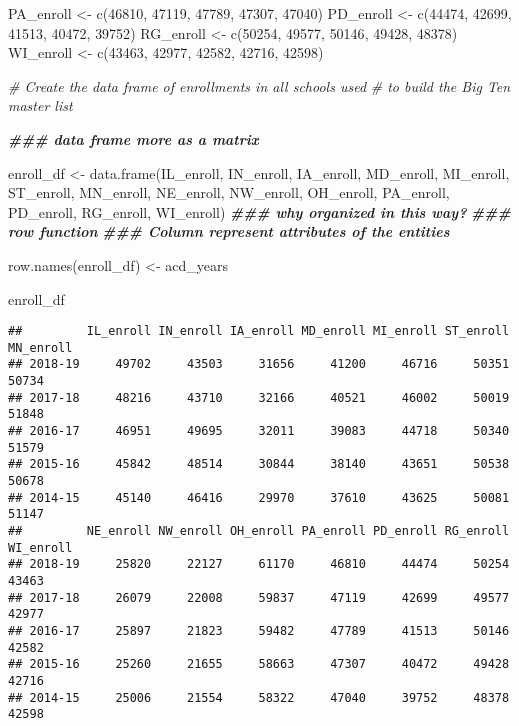 \documentclass[
]{article}
\newenvironment{Shaded}{\begin{snugshade}}{\end{snugshade}}
\newcommand{\CommentTok}[1]{\textcolor[rgb]{0.56,0.35,0.01}{\textit{#1}}}
\newcommand{\DecValTok}[1]{\textcolor[rgb]{0.00,0.00,0.81}{#1}}
\newcommand{\DocumentationTok}[1]{\textcolor[rgb]{0.56,0.35,0.01}{\textbf{\textit{#1}}}}
\newcommand{\FunctionTok}[1]{\textcolor[rgb]{0.00,0.00,0.00}{#1}}
\newcommand{\NormalTok}[1]{#1}
\newcommand{\OtherTok}[1]{\textcolor[rgb]{0.56,0.35,0.01}{#1}}
\begin{document}
\begin{Shaded}
\begin{Highlighting}[]
\NormalTok{PA\_enroll }\OtherTok{\textless{}{-}} \FunctionTok{c}\NormalTok{(}\DecValTok{46810}\NormalTok{, }\DecValTok{47119}\NormalTok{, }\DecValTok{47789}\NormalTok{, }\DecValTok{47307}\NormalTok{, }\DecValTok{47040}\NormalTok{)}
\NormalTok{PD\_enroll }\OtherTok{\textless{}{-}} \FunctionTok{c}\NormalTok{(}\DecValTok{44474}\NormalTok{, }\DecValTok{42699}\NormalTok{, }\DecValTok{41513}\NormalTok{, }\DecValTok{40472}\NormalTok{, }\DecValTok{39752}\NormalTok{)}
\NormalTok{RG\_enroll }\OtherTok{\textless{}{-}} \FunctionTok{c}\NormalTok{(}\DecValTok{50254}\NormalTok{, }\DecValTok{49577}\NormalTok{, }\DecValTok{50146}\NormalTok{, }\DecValTok{49428}\NormalTok{, }\DecValTok{48378}\NormalTok{)}
\NormalTok{WI\_enroll }\OtherTok{\textless{}{-}} \FunctionTok{c}\NormalTok{(}\DecValTok{43463}\NormalTok{, }\DecValTok{42977}\NormalTok{, }\DecValTok{42582}\NormalTok{, }\DecValTok{42716}\NormalTok{, }\DecValTok{42598}\NormalTok{)}

\CommentTok{\# Create the data frame of enrollments in all schools used }
\CommentTok{\# to build the Big Ten master list}

\DocumentationTok{\#\#\# data frame more as a matrix }

\NormalTok{enroll\_df }\OtherTok{\textless{}{-}} \FunctionTok{data.frame}\NormalTok{(IL\_enroll, IN\_enroll, IA\_enroll, MD\_enroll, MI\_enroll, }
\NormalTok{                    ST\_enroll, MN\_enroll, NE\_enroll, NW\_enroll, OH\_enroll, }
\NormalTok{                    PA\_enroll, PD\_enroll, RG\_enroll, WI\_enroll)}
\DocumentationTok{\#\#\# why organized in this way? }
\DocumentationTok{\#\#\# row function}
\DocumentationTok{\#\#\# Column represent attributes of the entities }


\FunctionTok{row.names}\NormalTok{(enroll\_df) }\OtherTok{\textless{}{-}}\NormalTok{ acd\_years}

\NormalTok{enroll\_df}
\end{Highlighting}
\end{Shaded}

\begin{verbatim}
##         IL_enroll IN_enroll IA_enroll MD_enroll MI_enroll ST_enroll MN_enroll
## 2018-19     49702     43503     31656     41200     46716     50351     50734
## 2017-18     48216     43710     32166     40521     46002     50019     51848
## 2016-17     46951     49695     32011     39083     44718     50340     51579
## 2015-16     45842     48514     30844     38140     43651     50538     50678
## 2014-15     45140     46416     29970     37610     43625     50081     51147
##         NE_enroll NW_enroll OH_enroll PA_enroll PD_enroll RG_enroll WI_enroll
## 2018-19     25820     22127     61170     46810     44474     50254     43463
## 2017-18     26079     22008     59837     47119     42699     49577     42977
## 2016-17     25897     21823     59482     47789     41513     50146     42582
## 2015-16     25260     21655     58663     47307     40472     49428     42716
## 2014-15     25006     21554     58322     47040     39752     48378     42598
\end{verbatim}
\end{document}
